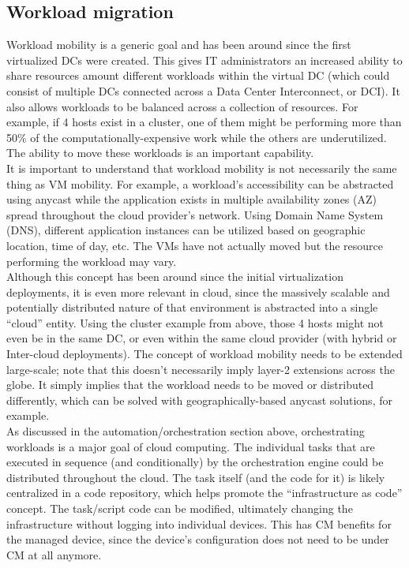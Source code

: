 \subsection{Workload migration}
Workload mobility is a generic goal and has been around since the first
virtualized DCs were created. This gives IT administrators an increased
ability to share resources amount different workloads within the virtual DC
(which could consist of multiple DCs connected across a Data Center
Interconnect, or DCI). It also allows workloads to be balanced across a
collection of resources. For example, if 4 hosts exist in a cluster, one of
them might be performing more than 50\% of the computationally-expensive work
while the others are underutilized. The ability to move these workloads is an
important capability. \\

It is important to understand that workload mobility is not necessarily the
same thing as VM mobility. For example, a workload’s accessibility can be
abstracted using anycast while the application exists in multiple availability
zones (AZ) spread throughout the cloud provider’s network. Using Domain Name
System (DNS), different application instances can be utilized based on
geographic location, time of day, etc. The VMs have not actually moved but the
resource performing the workload may vary. \\

Although this concept has been around since the initial virtualization
deployments, it is even more relevant in cloud, since the massively scalable
and potentially distributed nature of that environment is abstracted into a
single ``cloud'' entity. Using the cluster example from above, those 4 hosts
might not even be in the same DC, or even within the same cloud provider (with
hybrid or Inter-cloud deployments). The concept of workload mobility needs to
be extended large-scale; note that this doesn’t necessarily imply layer-2
extensions across the globe. It simply implies that the workload needs to be
moved or distributed differently, which can be solved with
geographically-based anycast solutions, for example. \\

As discussed in the automation/orchestration section above, orchestrating
workloads is a major goal of cloud computing. The individual tasks that are
executed in sequence (and conditionally) by the orchestration engine could be
distributed throughout the cloud. The task itself (and the code for it) is
likely centralized in a code repository, which helps promote the
``infrastructure as code'' concept. The task/script code can be modified,
ultimately changing the infrastructure without logging into individual
devices. This has CM benefits for the managed device, since the device's
configuration does not need to be under CM at all anymore.
